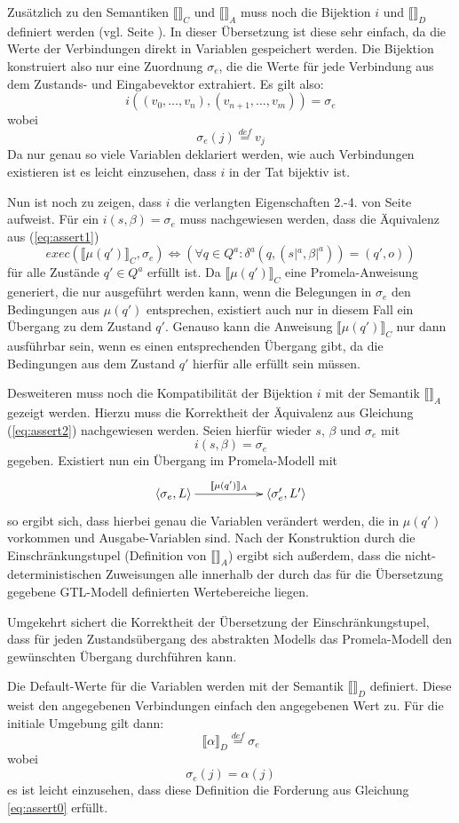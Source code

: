 Zusätzlich zu den Semantiken $\llbracket\rrbracket_C$ und $\llbracket\rrbracket_A$ muss noch die Bijektion $i$ und $\llbracket\rrbracket_D$ definiert werden (vgl. Seite \pageref{sec:translation-correctness}).
In dieser Übersetzung ist diese sehr einfach, da die Werte der Verbindungen direkt in Variablen gespeichert werden.
Die Bijektion konstruiert also nur eine Zuordnung $\sigma_e$, die die Werte für jede Verbindung aus dem Zustands- und Eingabevektor extrahiert.
Es gilt also:
\[ i((v_0,\dots,v_n),(v_{n+1},\dots,v_m)) = \sigma_e \]
wobei
\[ \sigma_e(j) \overset{def}{=} v_j \]
Da nur genau so viele Variablen deklariert werden, wie auch Verbindungen existieren ist es leicht einzusehen, dass $i$ in der Tat bijektiv ist.

Nun ist noch zu zeigen, dass $i$ die verlangten Eigenschaften 2.-4. von Seite \pageref{sec:bijection_conditions} aufweist.
Für ein $i(s,\beta)=\sigma_e$ muss nachgewiesen werden, dass die Äquivalenz aus (\ref{eq:assert1})
\[ \mathit{exec}(\llbracket \mu(q')\rrbracket_C,\sigma_e)\Leftrightarrow (\forall q\in Q^a: \delta^a(q,(s|^a,\beta|^a)) = (q',o)) \]
für alle Zustände $q'\in Q^a$ erfüllt ist.
Da $\llbracket\mu(q')\rrbracket_C$ eine Promela-Anweisung generiert, die nur ausgeführt werden kann, wenn die Belegungen in $\sigma_e$ den Bedingungen aus $\mu(q')$ entsprechen, existiert auch nur in diesem Fall ein Übergang zu dem Zustand $q'$.
Genauso kann die Anweisung $\llbracket\mu(q')\rrbracket_C$ nur dann ausführbar sein, wenn es einen entsprechenden Übergang gibt, da die Bedingungen aus dem Zustand $q'$ hierfür alle erfüllt sein müssen.

Desweiteren muss noch die Kompatibilität der Bijektion $i$ mit der Semantik $\llbracket\rrbracket_A$ gezeigt werden.
Hierzu muss die Korrektheit der Äquivalenz aus Gleichung (\ref{eq:assert2}) nachgewiesen werden.
Seien hierfür wieder $s$, $\beta$ und $\sigma_e$ mit 
\[ i(s,\beta) = \sigma_e \]
gegeben.
Existiert nun ein Übergang im Promela-Modell mit
\[ \xymatrix{ \left<\sigma_e,L\right> \ar[rr]^-{\llbracket \mu(q')\rrbracket_A} & & \left<\sigma_e',L'\right> } \]
so ergibt sich, dass hierbei genau die Variablen verändert werden, die in $\mu(q')$ vorkommen und Ausgabe-Variablen sind.
Nach der Konstruktion durch die Einschränkungstupel (Definition von $\llbracket\rrbracket_A$) ergibt sich außerdem, dass die nicht-deterministischen Zuweisungen alle innerhalb der durch das für die Übersetzung gegebene GTL-Modell definierten Wertebereiche liegen.

Umgekehrt sichert die Korrektheit der Übersetzung der Einschränkungstupel, dass für jeden Zustandsübergang des abstrakten Modells das Promela-Modell den gewünschten Übergang durchführen kann.

Die Default-Werte für die Variablen werden mit der Semantik $\llbracket\rrbracket_D$ definiert.
Diese weist den angegebenen Verbindungen einfach den angegebenen Wert zu.
Für die initiale Umgebung gilt dann:
\[ \llbracket \alpha\rrbracket_D \overset{def}{=} \sigma_e \]
wobei
\[ \sigma_e(j) = \alpha(j) \]
es ist leicht einzusehen, dass diese Definition die Forderung aus Gleichung \ref{eq:assert0} erfüllt.